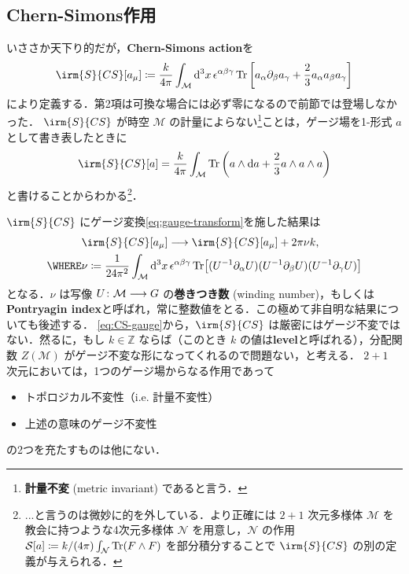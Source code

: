 \documentclass[TQFT_main]{subfiles}
\begin{document}
\subsection{Chern-Simons作用}

いささか天下り的だが，\textbf{Chern-Simons action}を
\begin{align}
    \irm{S}{CS}[a_\mu] \coloneqq \frac{k}{4\pi} \int_{\mathcal{M}} \dd[3]{x} \epsilon^{\alpha\beta\gamma} \Tr \left[ a_\alpha \partial_\beta a_\gamma + \frac{2}{3} a_\alpha a_\beta a_\gamma \right] 
\end{align}
により定義する．第2項は可換な場合には必ず零になるので前節では登場しなかった．
$\irm{S}{CS}$ が時空 $\mathcal{M}$ の計量によらない\footnote{\textbf{計量不変} (metric invariant) であると言う．}ことは，ゲージ場を1-形式 $a$ として書き表したときに
\begin{align}
    \irm{S}{CS}[a] = \frac{k}{4\pi} \int_{\mathcal{M}} \Tr \left( a \wedge \dd{a} + \frac{2}{3} a \wedge a \wedge a \right) 
\end{align}
と書けることからわかる\footnote{...と言うのは微妙に的を外している．より正確には $2+1$ 次元多様体 $\mathcal{M}$ を教会に持つような4次元多様体 $\mathcal{N}$ を用意し，$\mathcal{N}$ の作用 $\mathcal{S}[a] \coloneqq k/(4\pi) \int_{\mathcal{N}} \Tr (F \wedge F)$ を部分積分することで $\irm{S}{CS}$ の別の定義が与えられる．}．

$\irm{S}{CS}$ にゲージ変換\eqref{eq:gauge-transform}を施した結果は
\begin{align}
    &\irm{S}{CS}[a_\mu] \lto \irm{S}{CS}[a_\mu] + 2\pi \nu k, \label{eq:CS-gauge} \\
    \WHERE &\nu \coloneqq \frac{1}{24 \pi^2} \int_{\mathcal{M}} \dd[3]{x} \epsilon^{\alpha\beta\gamma} \Tr \bigl[ (U^{-1} \partial_\alpha U)(U^{-1} \partial_\beta U)(U^{-1} \partial_\gamma U) \bigr] 
\end{align}
となる．$\nu$ は写像 $U \colon \mathcal{M} \longrightarrow G$ の\textbf{巻きつき数} (winding number)，もしくは\textbf{Pontryagin index}と呼ばれ，常に整数値をとる．この極めて非自明な結果についても後述する．
\eqref{eq:CS-gauge}から，$\irm{S}{CS}$ は厳密にはゲージ不変ではない．然るに，もし $k \in \mathbb{Z}$ ならば（このとき $k$ の値は\textbf{level}と呼ばれる），分配関数 $Z (\mathcal{M})$ がゲージ不変な形になってくれるので問題ない，と考える．
$2+1$ 次元においては，1つのゲージ場からなる作用であって
\begin{itemize}
    \item トポロジカル不変性（i.e. 計量不変性）
    \item 上述の意味のゲージ不変性
\end{itemize}
の2つを充たすものは他にない．
\end{document}
